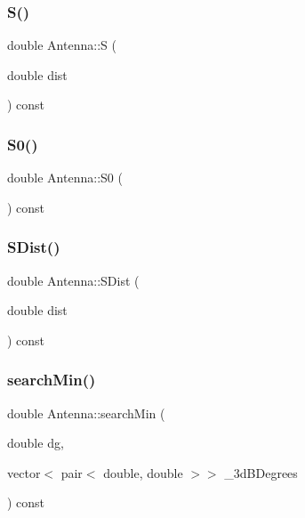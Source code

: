 \mbox{\label{class_antenna_a5715c4100035c58d63b7c9a0195748fe}} 
\subsubsection{\texorpdfstring{S()}{S()}}
{\footnotesize\ttfamily double Antenna\+::S (\begin{DoxyParamCaption}\item[{double}]{dist }\end{DoxyParamCaption}) const\hspace{0.3cm}{\ttfamily [private]}}

\mbox{\label{class_antenna_a033246c50bec80123860154a949620c7}} 
\subsubsection{\texorpdfstring{S0()}{S0()}}
{\footnotesize\ttfamily double Antenna\+::\+S0 (\begin{DoxyParamCaption}{ }\end{DoxyParamCaption}) const\hspace{0.3cm}{\ttfamily [private]}}

\mbox{\label{class_antenna_ae60ab40ded94be407c3b7455f4e886fe}} 
\subsubsection{\texorpdfstring{S\+Dist()}{SDist()}}
{\footnotesize\ttfamily double Antenna\+::\+S\+Dist (\begin{DoxyParamCaption}\item[{double}]{dist }\end{DoxyParamCaption}) const\hspace{0.3cm}{\ttfamily [private]}}

\mbox{\label{class_antenna_a48ef89b0d1bd313bae4ca863da1cc77e}} 
\subsubsection{\texorpdfstring{search\+Min()}{searchMin()}}
{\footnotesize\ttfamily double Antenna\+::search\+Min (\begin{DoxyParamCaption}\item[{double}]{dg,  }\item[{vector$<$ pair$<$ double, double $>$$>$}]{\+\_\+3d\+B\+Degrees }\end{DoxyParamCaption}) const\hspace{0.3cm}{\ttfamily [private]}}

